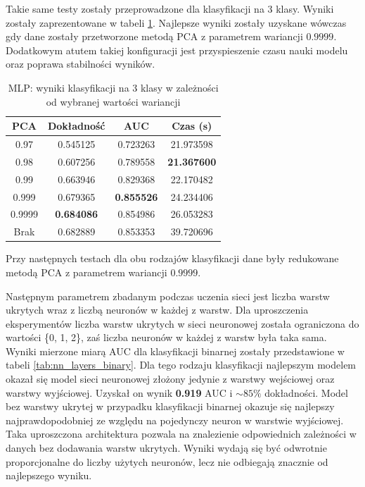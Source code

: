 \documentclass[a4paper, twoside, 11pt, openright]{article}
\begin{document}
Takie same testy zostały przeprowadzone dla klasyfikacji na 3 klasy. Wyniki zostały zaprezentowane w tabeli \ref{tab:nn_pca_discrete}. Najlepsze wyniki zostały uzyskane wówczas gdy dane zostały przetworzone metodą PCA z parametrem wariancji $0.9999$. Dodatkowym atutem takiej konfiguracji jest przyspieszenie czasu nauki modelu oraz poprawa stabilności wyników. 

\begin{table}[H]
    \centering
    \begin{tabular}{|c|c|c|c|}
    \hline
        \textbf{PCA} & \textbf{Dokładność} &  \textbf{AUC} &  \textbf{Czas (s)} \\ \hline
0.97               &  0.545125 &  0.723263 &   21.973598 \\ \hline
0.98               &  0.607256 &  0.789558 &   \textbf{21.367600} \\ \hline
0.99               &  0.663946 &  0.829368 &   22.170482 \\ \hline
0.999               &  0.679365 &  \textbf{0.855526} &   24.234406 \\ \hline
0.9999             &  \textbf{0.684086} &  0.854986 &   26.053283 \\ \hline
Brak                &  0.682889 &  0.853353 &   39.720696 \\ \hline
    \end{tabular}
    \caption{MLP: wyniki klasyfikacji na 3 klasy w zależności od wybranej wartości wariancji}
    \label{tab:nn_pca_discrete}
\end{table}

Przy następnych testach dla obu rodzajów klasyfikacji dane były redukowane metodą PCA z parametrem wariancji $0.9999$. 

\bigskip

Następnym parametrem zbadanym podczas uczenia sieci jest liczba warstw ukrytych wraz z liczbą neuronów w każdej z warstw. Dla uproszczenia eksperymentów liczba warstw ukrytych w sieci neuronowej została ograniczona do wartości \{0, 1, 2\}, zaś liczba neuronów w każdej z warstw była taka sama. Wyniki mierzone miarą AUC dla klasyfikacji binarnej zostały przedstawione w tabeli \ref{tab:nn_layers_binary}. Dla tego rodzaju klasyfikacji najlepszym modelem okazał się model sieci neuronowej złożony jedynie z warstwy wejściowej oraz warstwy wyjściowej. Uzyskał on wynik \textbf{0.919} AUC i $\sim 85\%$ dokładności. Model bez warstwy ukrytej w przypadku klasyfikacji binarnej okazuje się najlepszy najprawdopodobniej ze względu na pojedynczy neuron w warstwie wyjściowej. Taka uproszczona architektura pozwala na znalezienie odpowiednich zależności w danych bez dodawania warstw ukrytych. Wyniki wydają się być odwrotnie proporcjonalne do liczby użytych neuronów, lecz nie odbiegają znacznie od najlepszego wyniku.
\end{document}
